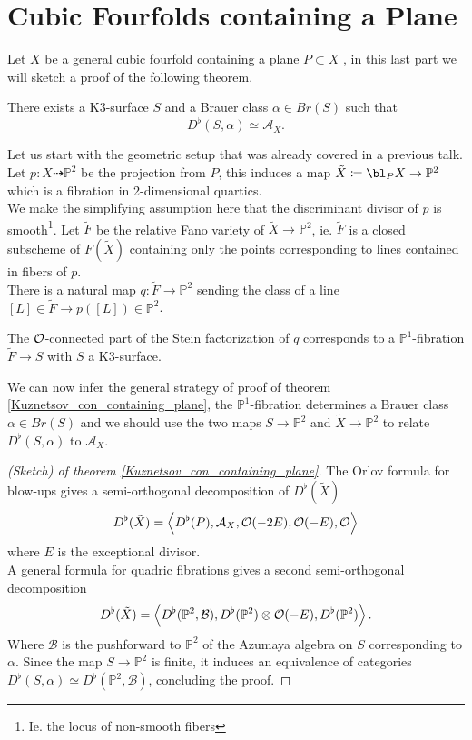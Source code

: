 \section{Cubic Fourfolds containing a Plane}
Let $X$ be a general cubic fourfold containing a plane $P \subset X$ , in this last part we will sketch a proof of the following theorem.
\begin{thm}\label{Kuznetsov_con_containing_plane}
	There exists a K3-surface $S$ and a Brauer class $\alpha \in Br( S) $ such that
\[ 
D^{\flat}( S, \alpha) \simeq \mathcal{A}_X.
\]
\end{thm}
Let us start with the geometric setup that was already covered in a previous talk.
Let $p \colon X \dashrightarrow \mathbb{P}^{2}$ be the projection from $P$, this induces a map $\tilde X \coloneq \bl_P X \to \mathbb{P}^{2}$ which is a fibration in 2-dimensional quartics.\\
We make the simplifying assumption here that the discriminant divisor of $p$ is smooth\footnote{Ie. the locus of non-smooth fibers }.
Let $\tilde F$ be the relative Fano variety of $\tilde X \to \mathbb{P}^{2}$, ie. $\tilde F$ is a closed subscheme of $F( \tilde X) $ containing only the points corresponding to lines contained in fibers of $p$.\\
There is a natural map $q\colon \tilde F \to \mathbb{P}^{2}$ sending the class of a line $ [ L] \in \tilde F \to p( [ L] )\in \mathbb{P}^{2} $.
\begin{propo}
The $\mathcal{O}$-connected part of the Stein factorization of $q$ corresponds to a $\mathbb{P}^{1}$-fibration $\tilde F \to S$ with $S$ a K3-surface.
\end{propo}
We can now infer the general strategy of proof of theorem \ref{Kuznetsov_con_containing_plane}, the $\mathbb{P}^{1}$-fibration determines a Brauer class $\alpha\in Br( S) $ and we should use the two maps $S \to \mathbb{P}^{2}$ and $\tilde X\to \mathbb{P}^{2}$ to relate $D^{\flat}( S, \alpha) $ to $\mathcal{A}_X$.
\begin{proof}[(Sketch) of theorem \ref{Kuznetsov_con_containing_plane}]
The Orlov formula for blow-ups gives a semi-orthogonal decomposition of $D^{\flat}( \tilde X) $ 
\[ 
D^{\flat}( \tilde X) = \left\langle D^{\flat}( P) , \mathcal{A}_X, \mathcal{O}( -2 E) , \mathcal{O}( -E),\mathcal{O}\right\rangle
\]
where $E$ is the exceptional divisor.\\
A general formula for quadric fibrations gives a second semi-orthogonal decomposition 
\[ 
D^{\flat}( \tilde X) = \left\langle D^{\flat}( \mathbb{P}^{2}, \mathcal{B}) , D^{\flat}( \mathbb{P}^{2}) \otimes \mathcal{O}( -E) , D^{\flat }( \mathbb{P}^{2})\right\rangle.
\]
Where $\mathcal{B}$ is the pushforward to $\mathbb{P}^{2}$  of the Azumaya algebra on $S$ corresponding to $\alpha$.
Since the map $S\to \mathbb{P}^{2}$ is finite, it induces an equivalence of categories $D^{\flat}( S, \alpha) \simeq D^{\flat}( \mathbb{P}^{2}, \mathcal{B}) $, concluding the proof.
\end{proof}








